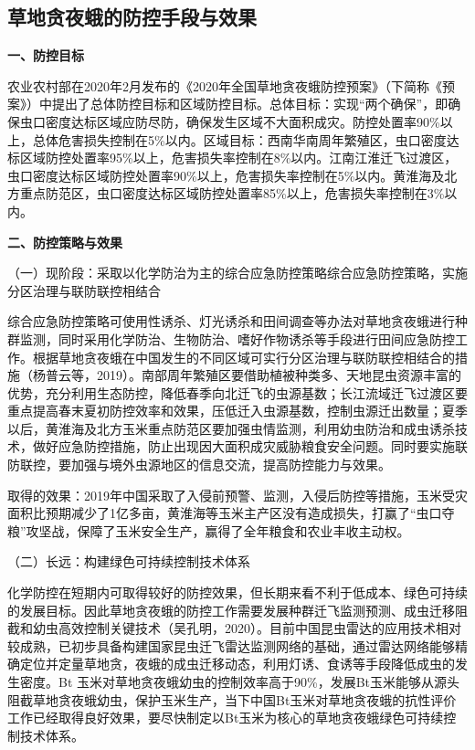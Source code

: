 \documentclass{progbookcn}
\begin{document}
\subsection{草地贪夜蛾的防控手段与效果}
\textbf{一、防控目标}

农业农村部在2020年2月发布的《2020年全国草地贪夜蛾防控预案》（下简称《预案》）中提出了总体防控目标和区域防控目标。总体目标：实现“两个确保”，即确保虫口密度达标区域应防尽防，确保发生区域不大面积成灾。防控处置率90\%以上，总体危害损失控制在5\%以内。区域目标：西南华南周年繁殖区，虫口密度达标区域防控处置率95\%以上，危害损失率控制在8\%以内。江南江淮迁飞过渡区，虫口密度达标区域防控处置率90\%以上，危害损失率控制在5\%以内。黄淮海及北方重点防范区，虫口密度达标区域防控处置率85\%以上，危害损失率控制在3\%以内。

\textbf{二、防控策略与效果}

（一）现阶段：采取以化学防治为主的综合应急防控策略综合应急防控策略，实施分区治理与联防联控相结合

综合应急防控策略可使用性诱杀、灯光诱杀和田间调查等办法对草地贪夜蛾进行种群监测，同时采用化学防治、生物防治、嗜好作物诱杀等手段进行田间应急防控工作。根据草地贪夜蛾在中国发生的不同区域可实行分区治理与联防联控相结合的措施（杨普云等，2019）。南部周年繁殖区要借助植被种类多、天地昆虫资源丰富的优势，充分利用生态防控，降低春季向北迁飞的虫源基数；长江流域迁飞过渡区要重点提高春末夏初防控效率和效果，压低迁入虫源基数，控制虫源迁出数量；夏季以后，黄淮海及北方玉米重点防范区要加强虫情监测，利用幼虫防治和成虫诱杀技术，做好应急防控措施，防止出现因大面积成灾威胁粮食安全问题。同时要实施联防联控，要加强与境外虫源地区的信息交流，提高防控能力与效果。

取得的效果：2019年中国采取了入侵前预警、监测，入侵后防控等措施，玉米受灾面积比预期减少了1亿多亩，黄淮海等玉米主产区没有造成损失，打赢了“虫口夺粮”攻坚战，保障了玉米安全生产，赢得了全年粮食和农业丰收主动权。

（二）长远：构建绿色可持续控制技术体系

化学防控在短期内可取得较好的防控效果，但长期来看不利于低成本、绿色可持续的发展目标。因此草地贪夜蛾的防控工作需要发展种群迁飞监测预测、成虫迁移阻截和幼虫高效控制关键技术（吴孔明，2020）。目前中国昆虫雷达的应用技术相对较成熟，已初步具备构建国家昆虫迁飞雷达监测网络的基础，通过雷达网络能够精确定位并定量草地贪，夜蛾的成虫迁移动态，利用灯诱、食诱等手段降低成虫的发生密度。Bt 玉米对草地贪夜蛾幼虫的控制效率高于90\%，发展Bt玉米能够从源头阻截草地贪夜蛾幼虫，保护玉米生产，当下中国Bt玉米对草地贪夜蛾的抗性评价工作已经取得良好效果，要尽快制定以Bt玉米为核心的草地贪夜蛾绿色可持续控制技术体系。
\end{document}
